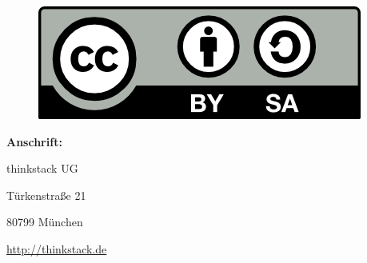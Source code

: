 \documentclass[fleqn,10pt]{SelfArx} %
\begin{document}
\begin{figure}[tbhp]
\includegraphics[width=0.3\linewidth]{cc}
\end{figure}

\textbf{Anschrift:}

thinkstack UG

Türkenstraße 21

80799 München

\url{http://thinkstack.de}


%

\end{document}
